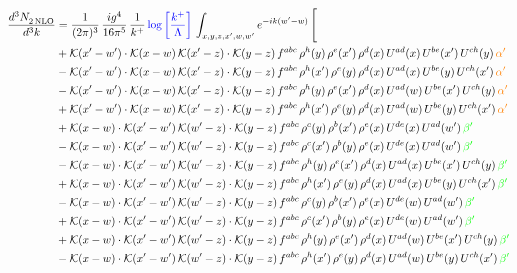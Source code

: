 \documentclass[9pt]{article}
\numberwithin{equation}{section}
\begin{document}
\begin{align}
  \frac{d^{3}N_{2\,\rm NLO}^{\rm}}{d^{3}k}  & = \frac{1}{(2\pi)^{3}}\, \frac{ig^{4}}{16\pi^{5}}\, \frac{1}{k^{+}}\, {\color{blue}\log{\left[\frac{k^{+}}{\Lambda}\right]}}\, \int_{x,y,z,x^{\prime},w,w^{\prime}}e^{-ik(w^{\prime}-w)}\, \Bigg[\notag \\ &   +\mathcal{K}(x'-w')\cdot\mathcal{K}(x-w)\,\mathcal{K}(x'-z)\cdot\mathcal{K}(y-z)\, f^{abc}\,\rho^{h}(y)\,\rho^{e}(x')\,\rho^{d}(x)\,U^{ad}(x)\,U^{be}(x')\,U^{ch}(y)\,{\color{orange}\alpha'}\notag\\ &-\mathcal{K}(x'-w')\cdot\mathcal{K}(x-w)\,\mathcal{K}(x'-z)\cdot\mathcal{K}(y-z)\, f^{abc}\,\rho^{h}(x')\,\rho^{e}(y)\,\rho^{d}(x)\,U^{ad}(x)\,U^{be}(y)\,U^{ch}(x')\,{\color{orange}\alpha'}\notag\\ &-\mathcal{K}(x'-w')\cdot\mathcal{K}(x-w)\,\mathcal{K}(x'-z)\cdot\mathcal{K}(y-z)\, f^{abc}\,\rho^{h}(y)\,\rho^{e}(x')\,\rho^{d}(x)\,U^{ad}(w)\,U^{be}(x')\,U^{ch}(y)\,{\color{orange}\alpha'}\notag \\ &+\mathcal{K}(x'-w')\cdot\mathcal{K}(x-w)\,\mathcal{K}(x'-z)\cdot\mathcal{K}(y-z)\, f^{abc}\,\rho^{h}(x')\,\rho^{e}(y)\,\rho^{d}(x)\,U^{ad}(w)\,U^{be}(y)\,U^{ch}(x')\,{\color{orange}\alpha'}\notag \\ & +\mathcal{K}(x-w)\cdot\mathcal{K}(x'-w')\,\mathcal{K}(w'-z)\cdot\mathcal{K}(y-z)\, f^{abc}\,\rho^{c}(y)\,\rho^{b}(x')\,\rho^{e}(x)\,U^{de}(x)\,U^{ad}(w')\,{\color{green}\beta'}\notag \\ &-\mathcal{K}(x-w)\cdot\mathcal{K}(x'-w')\,\mathcal{K}(w'-z)\cdot\mathcal{K}(y-z)\, f^{abc}\,\rho^{c}(x')\,\rho^{b}(y)\,\rho^{e}(x)\,U^{de}(x)\,U^{ad}(w')\,{\color{green}\beta'}\notag \\ & -\mathcal{K}(x-w)\cdot\mathcal{K}(x'-w')\,\mathcal{K}(w'-z)\cdot\mathcal{K}(y-z)\, f^{abc}\,\rho^{h}(y)\,\rho^{e}(x')\,\rho^{d}(x)\,U^{ad}(x)\,U^{be}(x')\,U^{ch}(y)\,{\color{green}\beta'}\notag\\ &+\mathcal{K}(x-w)\cdot\mathcal{K}(x'-w')\,\mathcal{K}(w'-z)\cdot\mathcal{K}(y-z)\, f^{abc}\,\rho^{h}(x')\,\rho^{e}(y)\,\rho^{d}(x)\,U^{ad}(x)\,U^{be}(y)\,U^{ch}(x')\,{\color{green}\beta'}\notag\\ &-\mathcal{K}(x-w)\cdot\mathcal{K}(x'-w')\,\mathcal{K}(w'-z)\cdot\mathcal{K}(y-z)\, f^{abc}\,\rho^{c}(y)\,\rho^{b}(x')\,\rho^{e}(x)\,U^{de}(w)\,U^{ad}(w')\,{\color{green}\beta'}\notag\\ &+\mathcal{K}(x-w)\cdot\mathcal{K}(x'-w')\,\mathcal{K}(w'-z)\cdot\mathcal{K}(y-z)\, f^{abc}\,\rho^{c}(x')\,\rho^{b}(y)\,\rho^{e}(x)\,U^{de}(w)\,U^{ad}(w')\,{\color{green}\beta'}\notag\\ &+\mathcal{K}(x-w)\cdot\mathcal{K}(x'-w')\,\mathcal{K}(w'-z)\cdot\mathcal{K}(y-z)\, f^{abc}\,\rho^{h}(y)\,\rho^{e}(x')\,\rho^{d}(x)\,U^{ad}(w)\,U^{be}(x')\,U^{ch}(y)\,{\color{green}\beta'}\notag \\ &-\mathcal{K}(x-w)\cdot\mathcal{K}(x'-w')\,\mathcal{K}(w'-z)\cdot\mathcal{K}(y-z)\, f^{abc}\,\rho^{h}(x')\,\rho^{e}(y)\,\rho^{d}(x)\,U^{ad}(w)\,U^{be}(y)\,U^{ch}(x')\,{\color{green}\beta'}
\end{align}  
\end{document}
